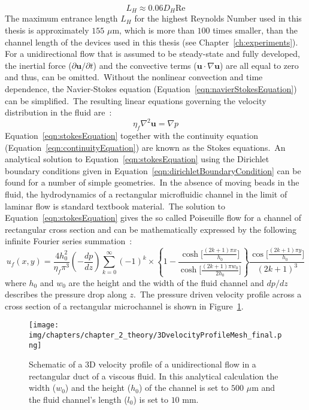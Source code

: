 \begin{equation}
	L_{H} \approx 0.06 D_{H} \text{Re}
	\label{eqn:entranceLength}
\end{equation}
The maximum entrance length $L_{H}$ for the highest Reynolds Number used in this thesis is approximately $155$ $\mu$m, which is more than $100$ times smaller, than the channel length of the devices used in this thesis (see Chapter~\ref{ch:experiments}).\\
For a unidirectional flow that is assumed to be steady-state and fully developed, the inertial force ($\partial \mathbf{u}/\partial t$) and the convective terms ($\mathbf{u}\cdot\nabla\mathbf{u}$) are all equal to zero and thus, can be omitted.\ Without the nonlinear convection and time dependence, the Navier-Stokes equation (Equation~\ref{eqn:navierStokesEquation}) can be simplified.\ The resulting linear equations governing the velocity distribution in the fluid are~\cite{Happel2012}:\
\begin{equation}
	\eta_{f} \nabla^{2}\mathbf{u} = \nabla p 
	\label{eqn:stokesEquation}
\end{equation}
Equation~\ref{eqn:stokesEquation} together with the continuity equation (Equation~\ref{eqn:continuityEquation}) are known as the Stokes equations.\ An analytical solution to Equation~\ref{eqn:stokesEquation} using the Dirichlet boundary conditions given in Equation~\ref{eqn:dirichletBoundaryCondition} can be found for a number of simple geometries.\ In the absence of moving beads in the fluid, the hydrodynamics of a rectangular microfluidic channel in the limit of laminar flow is standard textbook material.\ The solution to Equation~\ref{eqn:stokesEquation} gives the so called Poiseuille flow for a channel of rectangular cross section and can be mathematically expressed by the following infinite Fourier series summation~\cite{White2006}:\
\begin{equation}
	u_{f}(x,y) = \frac{4h_{0}^{2}}{\eta_{f}\pi^3}\left(-\frac{dp}{dz}\right)\sum_{k=0}^{\infty}(-1)^{k}\times\left\{ 1 - \frac{\cosh\Big[\frac{(2k+1)\pi x}{h_{0}}\Big]}{\cosh\Big[\frac{(2k+1)\pi w_{0}}{2h_{0}}\Big]} \right\} \frac{\cos\Big[\frac{(2k+1)\pi y}{h_{0}}\Big]}{(2k+1)^{3}}
	\label{eqn:velocityProfileRectangularDuct}
\end{equation}
where $h_{0}$ and $w_{0}$ are the height and the width of the fluid channel and $dp/dz$ describes the pressure drop along $z$.\ The pressure driven velocity profile across a cross section of a rectangular microchannel is shown in Figure~\ref{fig:velocityProfile3D}.\
\begin{figure}[htb]
	\centering
   \texttt{[image: img/chapters/chapter\_2\_theory/3DvelocityProfileMesh\_final.png]}
	\caption[Schematic of a 3D velocity profile of a unidirectional flow in a rectangular duct of a viscous fluid]{Schematic of a 3D velocity profile of a unidirectional flow in a rectangular duct of a viscous fluid. In this analytical calculation the width ($w_{0}$) and the height ($h_{0}$) of the channel is set to $500$ $\mu$m and the fluid channel's length ($l_{0}$) is set to $10$ mm.}
\label{fig:velocityProfile3D}
\end{figure}
%
